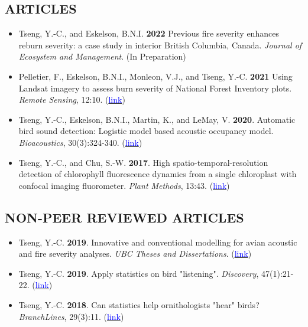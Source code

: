 \documentclass[11pt,letterpaper,sans]{moderncv}        %
\begin{document}
\subsection{ARTICLES}
\begin{itemize}
\item{Tseng, Y.-C., and Eskelson, B.N.I. \textbf{2022} Previous fire severity enhances reburn severity: a case study in interior British Columbia, Canada. \textit{Journal of Ecosystem and Management}. (In Preparation)}
\vspace{3pt}

\item{Pelletier, F., Eskelson, B.N.I., Monleon, V.J., and Tseng, Y.-C. \textbf{2021} Using Landsat imagery to assess burn severity of National Forest Inventory plots. \textit{Remote Sensing}, 12:10. (\href{https://www.mdpi.com/2072-4292/13/10/1935}{\textcolor{blue}{link}})}
\vspace{3pt}


\item{Tseng, Y.-C., Eskelson, B.N.I., Martin, K., and LeMay, V. \textbf{2020}. Automatic bird sound detection: Logistic model based acoustic occupancy model. \textit{Bioacoustics}, 30(3):324-340. (\href{https://www.tandfonline.com/doi/abs/10.1080/09524622.2020.1730241}{\textcolor{blue}{link}})

}
\vspace{3pt}


\item{Tseng, Y.-C., and Chu, S.-W. \textbf{2017}. High spatio-temporal-resolution detection of chlorophyll fluorescence dynamics from a single chloroplast with confocal imaging fluorometer. \textit{Plant Methods}, 13:43. (\href{https://doi.org/10.1186/s13007-017-0194-2}{\textcolor{blue}{link}})}
\end{itemize}

\subsection{NON-PEER REVIEWED ARTICLES}
\begin{itemize}
\item{Tseng, Y.-C. \textbf{2019}. Innovative and conventional modelling for avian acoustic and fire severity analyses. \textit{UBC Theses and Dissertations}}. (\href{https://open.library.ubc.ca/cIRcle/collections/ubctheses/24/items/1.0385980}{\textcolor{blue}{link}})
\vspace{3pt}

\item{Tseng, Y.-C. \textbf{2019}. Apply statistics on bird "listening". \textit{Discovery}}, 47(1):21-22. (\href{https://drive.google.com/open?id=1lZC8H246lFH-XCGI6vtBjXMIq1YqukUG}{\textcolor{blue}{link}})
\vspace{3pt}

\item{Tseng, Y.-C. \textbf{2018}. Can statistics help ornithologists "hear" birds? \textit{BranchLines}}, 29(3):11. (\href{https://forestry.ubc.ca/files/2019/04/bl-29.3.pdf#page=11}{\textcolor{blue}{link}}) 
\vspace{3pt}
\end{itemize}
\end{document}
